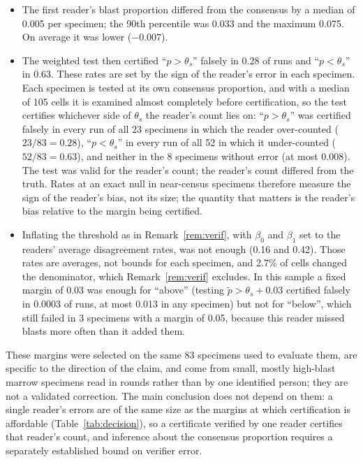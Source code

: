 \documentclass[11pt]{article}
\theoremstyle{remark}
\theoremstyle{definition}
\begin{document}
\begin{itemize}
\item The first reader's blast proportion differed from the consensus by a median of 0.005 per specimen; the 90th percentile was 0.033 and the maximum 0.075. On average it was lower ($-0.007$).
\item The weighted test then certified ``$p>\theta_s$'' falsely in 0.28 of runs and ``$p<\theta_s$'' in 0.63. These rates are set by the sign of the reader's error in each specimen. Each specimen is tested at its own consensus proportion, and with a median of 105 cells it is examined almost completely before certification, so the test certifies whichever side of $\theta_s$ the reader's count lies on: ``$p>\theta_s$'' was certified falsely in every run of all 23 specimens in which the reader over-counted ($23/83=0.28$), ``$p<\theta_s$'' in every run of all 52 in which it under-counted ($52/83=0.63$), and neither in the 8 specimens without error (at most 0.008). The test was valid for the reader's count; the reader's count differed from the truth. Rates at an exact null in near-census specimens therefore measure the sign of the reader's bias, not its size; the quantity that matters is the reader's bias relative to the margin being certified.
\item Inflating the threshold as in Remark~\ref{rem:verif}, with $\beta_0$ and $\beta_1$ set to the readers' average disagreement rates, was not enough (0.16 and 0.42). Those rates are averages, not bounds for each specimen, and 2.7\% of cells changed the denominator, which Remark~\ref{rem:verif} excludes. In this sample a fixed margin of 0.03 was enough for ``above'' (testing $\tilde p>\theta_s+0.03$ certified falsely in 0.0003 of runs, at most 0.013 in any specimen) but not for ``below'', which still failed in 3 specimens with a margin of 0.05, because this reader missed blasts more often than it added them.
\end{itemize}
These margins were selected on the same 83 specimens used to evaluate them, are specific to the direction of the claim, and come from small, mostly high-blast marrow specimens read in rounds rather than by one identified person; they are not a validated correction. The main conclusion does not depend on them: a single reader's errors are of the same size as the margins at which certification is affordable (Table~\ref{tab:decision}), so a certificate verified by one reader certifies that reader's count, and inference about the consensus proportion requires a separately established bound on verifier error.
\end{document}
